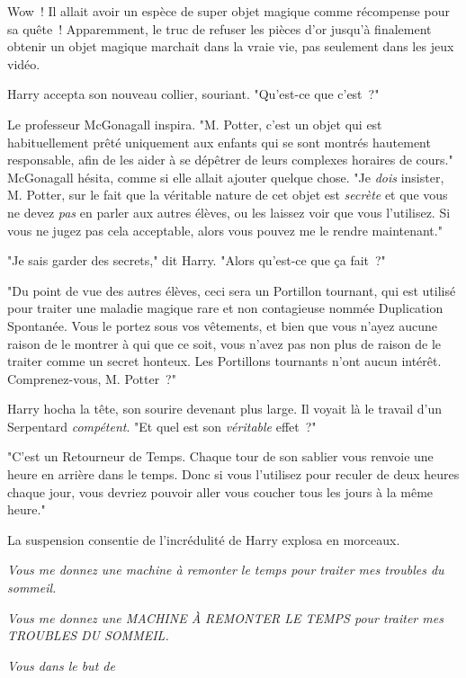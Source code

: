 Wow~! Il allait avoir un espèce de super objet magique comme récompense pour sa quête~! Apparemment, le truc de refuser les pièces d'or jusqu'à finalement obtenir un objet magique marchait dans la vraie vie, pas seulement dans les jeux vidéo.

Harry accepta son nouveau collier, souriant. "Qu'est-ce que c'est~?"

Le professeur McGonagall inspira. "M. Potter, c'est un objet qui est habituellement prêté uniquement aux enfants qui se sont montrés hautement responsable, afin de les aider à se dépêtrer de leurs complexes horaires de cours." McGonagall hésita, comme si elle allait ajouter quelque chose. "Je \emph{dois} insister, M. Potter, sur le fait que la véritable nature de cet objet est \emph{secrète} et que vous ne devez \emph{pas} en parler aux autres élèves, ou les laissez voir que vous l'utilisez. Si vous ne jugez pas cela acceptable, alors vous pouvez me le rendre maintenant."

"Je sais garder des secrets," dit Harry. "Alors qu'est-ce que ça fait~?"

"Du point de vue des autres élèves, ceci sera un Portillon tournant, qui est utilisé pour traiter une maladie magique rare et non contagieuse nommée Duplication Spontanée. Vous le portez sous vos vêtements, et bien que vous n'ayez aucune raison de le montrer à qui que ce soit, vous n'avez pas non plus de raison de le traiter comme un secret honteux. Les Portillons tournants n'ont aucun intérêt. Comprenez-vous, M. Potter~?"

Harry hocha la tête, son sourire devenant plus large. Il voyait là le travail d'un Serpentard \emph{compétent}. "Et quel est son \emph{véritable} effet~?"

"C'est un Retourneur de Temps. Chaque tour de son sablier vous renvoie une heure en arrière dans le temps. Donc si vous l'utilisez pour reculer de deux heures chaque jour, vous devriez pouvoir aller vous coucher tous les jours à la même heure."

La suspension consentie de l'incrédulité de Harry explosa en morceaux.

\emph{Vous me donnez une machine à remonter le temps pour traiter mes troubles du sommeil.}

\emph{Vous me donnez une MACHINE À REMONTER LE TEMPS pour traiter mes TROUBLES DU SOMMEIL.}

\emph{Vous  dans le but de }

